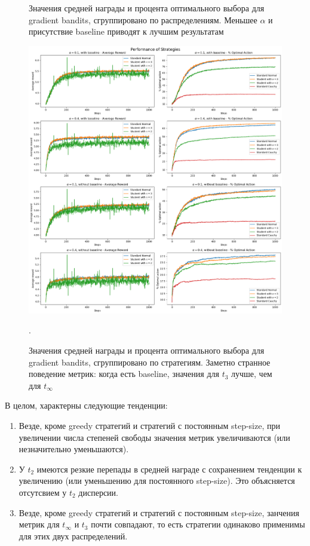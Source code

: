 \documentclass{article}
\begin{document}
\begin{enumerate}
\begin{figure}
        \caption{\label{fig:gradient_1}Значения средней награды и процента оптимального выбора для gradient bandits, сгруппировано по распределениям. Меньшее $\alpha$ и присутствие baseline приводят к лучшим результатам}
    \end{figure}
    \begin{figure}[t]
        \includegraphics[width=1.1\linewidth]{gradient_2.png}
        \caption{\label{fig:gradient_2}Значения средней награды и процента оптимального выбора для gradient bandits, сгруппировано по стратегиям. Заметно странное поведение метрик: когда есть baseline, значения для $t_3$ лучше, чем для $t_{\infty}$}.
    \end{figure}
\end{enumerate}

В целом, характерны следующие тенденции:
\begin{enumerate}
    \item Везде, кроме greedy стратегий и стратегий с постоянным step-size, при увеличении числа степеней свободы значения метрик увеличиваются (или незначительно уменьшаются).
    \item У $t_2$ имеются резкие перепады в средней награде с сохранением тенденции к увеличению (или уменьшению для постоянного step-size). Это объясняется отсутсвием у $t_2$ дисперсии.
    \item Везде, кроме greedy стратегий и стратегий с постоянным step-size, занчения метрик для $t_{\infty}$ и $t_3$ почти совпадают, то есть стратегии одинаково применимы для этих двух распределений.
\end{enumerate}
\end{document}
